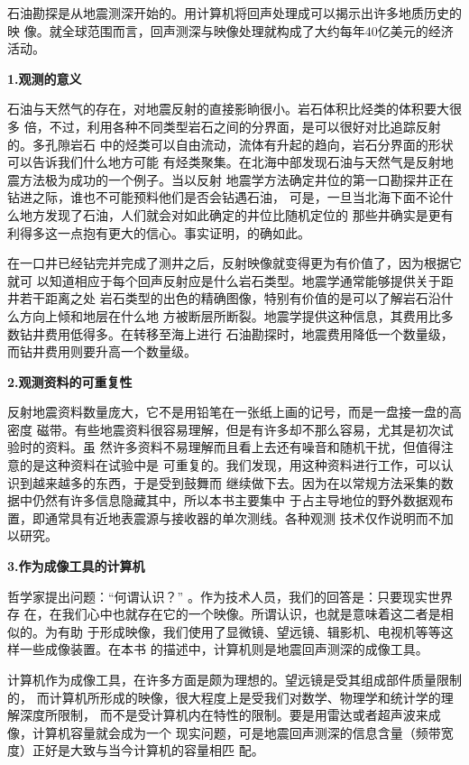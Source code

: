 石油勘探是从地震测深开始的。用计算机将回声处理成可以揭示出许多地质历史的映
像。就全球范围而言，回声测深与映像处理就构成了大约每年40亿美元的经济活动。


\textbf{1.观测的意义}


石油与天然气的存在，对地震反射的直接影晌很小。岩石体积比烃类的体积要大很多
倍，不过，利用各种不同类型岩石之间的分界面，是可以很好对比追踪反射的。多孔隙岩石
中的烃类可以自由流动，流体有升起的趋向，岩石分界面的形状可以告诉我们什么地方可能
有烃类聚集。在北海中部发现石油与天然气是反射地震方法极为成功的一个例子。当以反射
地震学方法确定井位的第一口勘探井正在钻进之际，谁也不可能预料他们是否会钻遇石油，
可是，一旦当北海下面不论什么地方发现了石油，人们就会对如此确定的井位比随机定位的
那些井确实是更有利得多这一点抱有更大的信心。事实证明，的确如此。

在一口井已经钻完并完成了测井之后，反射映像就变得更为有价值了，因为根据它就可
以知道相应于每个回声反射应是什么岩石类型。地震学通常能够提供关于距井若干距离之处
岩石类型的出色的精确图像，特别有价值的是可以了解岩石沿什么方向上倾和地层在什么地
方被断层所断裂。地震学提供这种信息，其费用比多数钻井费用低得多。在转移至海上进行
石油勘探时，地震费用降低一个数量级，而钻井费用则要升高一个数量级。


\textbf{2.观测资料的可重复性}

反射地震资料数量庞大，它不是用铅笔在一张纸上画的记号，而是一盘接一盘的高密度
磁带。有些地震资料很容易理解，但是有许多却不那么容易，尤其是初次试验时的资料。虽
然许多资料不易理解而且看上去还有噪音和随机干扰，但值得注意的是这种资料在试验中是
可重复的。我们发现，用这种资料进行工作，可以认识到越来越多的东西，于是受到鼓舞而
继续做下去。因为在以常规方法采集的数据中仍然有许多信息隐藏其中，所以本书主要集中
于占主导地位的野外数据观布置，即通常具有近地表震源与接收器的单次测线。各种观测
技术仅作说明而不加以研究。


\textbf{3.作为成像工具的计算机}


哲学家提出问题：``何谓认识？''
。作为技术人员，我们的回答是：只要现实世界存
在，在我们心中也就存在它的一个映像。所谓认识，也就是意味着这二者是相似的。为有助
于形成映像，我们使用了显微镜、望远镜、辑影机、电视机等等这样一些成像装置。在本书
的描述中，计算机则是地震回声测深的成像工具。

计算机作为成像工具，在许多方面是颇为理想的。望远镜是受其组成部件质量限制的，
而计算机所形成的映像，很大程度上是受我们对数学、物理学和统计学的理解深度所限制，
而不是受计算机内在特性的限制。要是用雷达或者超声波来成像，计算机容量就会成为一个
现实问题，可是地震回声测深的信息含量（频带宽度）正好是大致与当今计算机的容量相匹
配。


